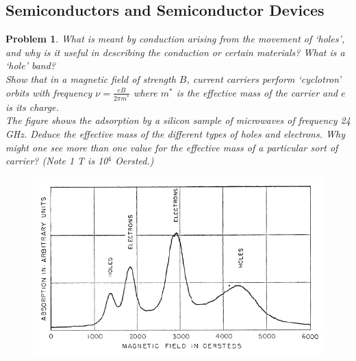 \documentclass[a4paper]{article}
\theoremstyle{new}
\newtheorem{qns}{Problem}[section]
\begin{document}
\subsection*{Semiconductors and Semiconductor Devices}
\begin{qns}
What is meant by conduction arising from the movement of ‘holes’, and why is it useful in describing the conduction or certain materials? What is a ‘hole’ band?\\[5pt]
Show that in a magnetic field of strength $B$, current carriers perform ‘cyclotron’ orbits with frequency $\nu=\frac{eB}{2\pi m^*}$ where $m^*$ is the effective mass of the carrier and $e$ is its charge.\\[5pt]
The figure shows the adsorption by a silicon sample of microwaves of frequency 24 GHz. Deduce the effective mass of the different types of holes and electrons. Why might one see more than one value for the effective mass of a particular sort of carrier? (Note 1 T is 10$^4$ Oersted.)
\begin{figure}[H]
    \centering
    \includegraphics[width=\linewidth]{4_9_2.PNG}
\end{figure}
\end{qns}
\end{document}
